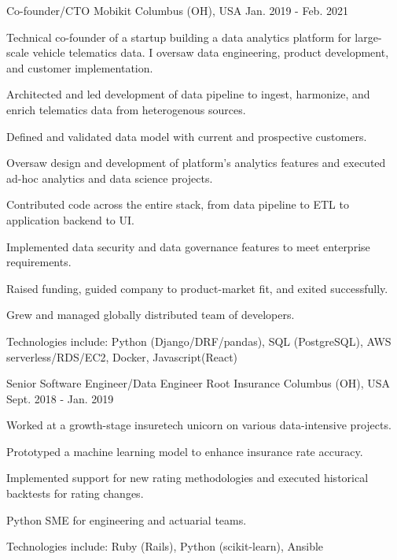 \begin{cventries}
  \cventry
    {Co-founder/CTO} %
    {Mobikit} %
    {Columbus (OH), USA} %
    {Jan. 2019 - Feb. 2021} %
    {
      Technical co-founder of a startup building a data analytics platform for large-scale vehicle telematics data. I oversaw data engineering, product development, and customer implementation.
      \vspace{5.0mm}
      \begin{cvitems} %
        \item {Architected and led development of data pipeline to ingest, harmonize, and enrich telematics data from heterogenous sources.}
        \item {Defined and validated data model with current and prospective customers.}
        \item {Oversaw design and development of platform's analytics features and executed ad-hoc analytics and data science projects.}
        \item {Contributed code across the entire stack, from data pipeline to ETL to application backend to UI.}
        \item {Implemented data security and data governance features to meet enterprise requirements.}
        \item {Raised funding, guided company to product-market fit, and exited successfully.}
        \item {Grew and managed globally distributed team of developers.}
        \item {Technologies include: Python (Django/DRF/pandas), SQL (PostgreSQL), AWS serverless/RDS/EC2, Docker, Javascript(React)}
      \end{cvitems}
    }

  \cventry
    {Senior Software Engineer/Data Engineer} %
    {Root Insurance} %
    {Columbus (OH), USA} %
    {Sept. 2018 - Jan. 2019} %
    {
      Worked at a growth-stage insuretech unicorn on various data-intensive projects.
      \vspace{5.0mm}
      \begin{cvitems} %
        \item {Prototyped a machine learning model to enhance insurance rate accuracy.}
        \item {Implemented support for new rating methodologies and executed historical backtests for rating changes.}
        \item {Python SME for engineering and actuarial teams.}
        \item {Technologies include: Ruby (Rails), Python (scikit-learn), Ansible}
      \end{cvitems}
    }


\end{cventries}
